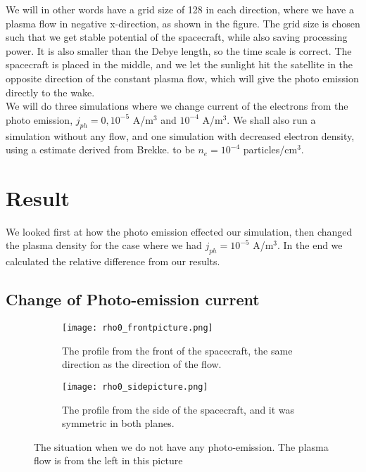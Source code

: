 \documentclass[aip, 
rsi, 
amsmath,
amssymb,
longbibliography,
preprint]{revtex4-1}
\begin{document}
 We will in other words have a grid size of 128 in each direction, where we have a plasma flow in negative x-direction, as shown in the figure. The grid size is chosen such that we get stable potential of the spacecraft, while also saving processing power. It is also smaller than the Debye length, so the time scale is correct. The spacecraft is placed in the middle, and we let the sunlight hit the satellite in the opposite direction of the constant plasma flow, which will give the photo emission directly to the wake.\\
 
 We will do three simulations where we change current of the electrons from the photo emission, $j_{ph} = 0, 10^{-5}$ A/m$^3$ and $10^{-4}$ A/m$^3$. We shall also run a simulation without any flow, and one simulation with decreased electron density, using a estimate derived from Brekke.\cite{Brekke} to be $n_e = 10^{-4}$ particles/cm$^3$.

\section{Result}

We looked first at how the photo emission effected our simulation, then changed the plasma density for the case where we had $j_{ph} = 10^{-5}$ A/m$^3$. In the end we calculated the relative difference from our results.

\subsection{Change of Photo-emission current}

\begin{figure*}
\begin{subfigure}{0.45\textwidth}
\texttt{[image: rho0\_frontpicture.png]}
\caption{The profile from the front of the spacecraft, the same direction as the direction of the flow.}
\end{subfigure}
\begin{subfigure}{0.45\textwidth}
\texttt{[image: rho0\_sidepicture.png]}
\caption{The profile from the side of the spacecraft, and it was symmetric in both planes.}
\end{subfigure}
\caption{The situation when we do not have any photo-emission. The plasma flow is from the left in this picture\label{fig:profile_nocurrent}}
\end{figure*}
\end{document}
